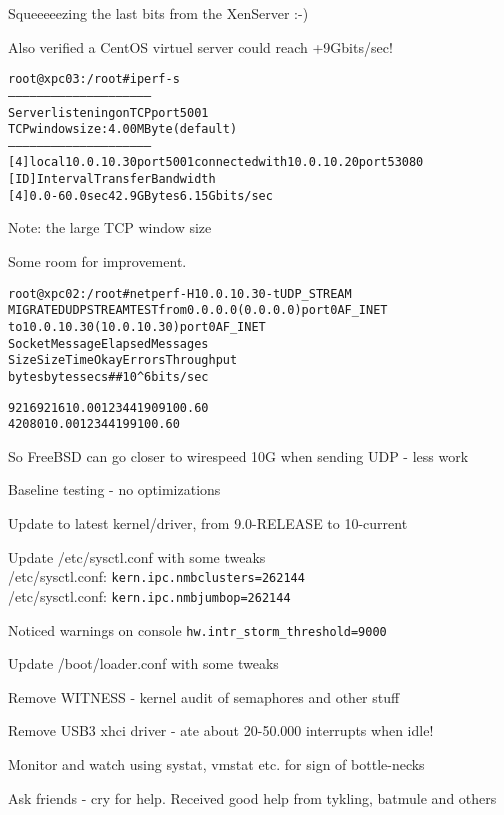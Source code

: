 \documentclass[20pt,landscape,a4paper,footrule]{foils}
\begin{document}
Squeeeeezing the last bits from the XenServer :-)

Also verified a CentOS virtuel server could reach +9Gbits/sec!

\begin{alltt}\small
root@xpc03:/root # iperf -s
------------------------------------------------------------
Server listening on TCP port 5001
TCP window size: 4.00 MByte (default)
------------------------------------------------------------
[  4] local 10.0.10.30 port 5001 connected with 10.0.10.20 port 53080
[ ID] Interval       Transfer     Bandwidth
[  4]  0.0-60.0 sec  42.9 GBytes  6.15 Gbits/sec
\end{alltt}

\vskip 1cm

Note: the large TCP window size

Some room for improvement.

\begin{alltt}\small
root@xpc02:/root # netperf -H 10.0.10.30 -t UDP_STREAM
MIGRATED UDP STREAM TEST from 0.0.0.0 (0.0.0.0) port 0 AF_INET
to 10.0.10.30 (10.0.10.30) port 0 AF_INET
Socket  Message  Elapsed      Messages               
Size    Size     Time         Okay Errors   Throughput
bytes   bytes    secs            #      #   10^6bits/sec

  9216    9216   10.00     1234419      0    9100.60
 42080           10.00     1234419           9100.60
\end{alltt}

\vskip 1cm

So FreeBSD can go closer to wirespeed 10G when sending UDP - less work

\begin{list1}
\item Baseline testing - no optimizations 
\item Update to latest kernel/driver, from 9.0-RELEASE to 10-current
\item Update /etc/sysctl.conf with some tweaks\\
/etc/sysctl.conf: \verb+kern.ipc.nmbclusters=262144+\\
/etc/sysctl.conf: \verb+kern.ipc.nmbjumbop=262144+\\
\item Noticed warnings on console \verb+hw.intr_storm_threshold=9000+
\item Update /boot/loader.conf with some tweaks
\item Remove WITNESS - kernel audit of semaphores and other stuff
\item Remove USB3 xhci driver - ate about 20-50.000 interrupts when idle!
\item Monitor and watch using systat, vmstat etc. for sign of bottle-necks
\item Ask friends - cry for help. Received good help from tykling, batmule and others
\end{list1}
\end{document}
